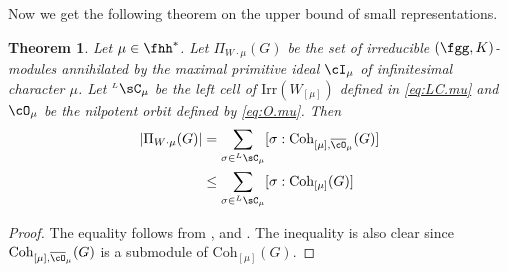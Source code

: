 \documentclass[12pt,a4paper]{amsart}
\def\abs#1{\left|{#1}\right|}
\DeclareMathOperator{\Ann}{Ann}
\numberwithin{equation}{section}
\newtheorem{thm}{Theorem}[section]
\newtheorem{cor}[thm]{Corollary}
\theoremstyle{remark}
\def\Irr{\mathrm{Irr}}
\def\LC{{}^{\scriptscriptstyle L}\sC}
\def\Coh{\mathrm{Coh}}
\begin{document}
\medskip

Now we get the following theorem on the upper bound of small representations.
\begin{thm}
  Let $\mu\in \fhh^{*}$. Let $\Pi_{W\cdot \mu}(G)$ be the set of irreducible
  $(\fgg,K)$-modules annihilated by the maximal primitive ideal $\cI_{\mu}$ of
  infinitesimal character $\mu$. Let $\LC_{\mu}$ be the left cell of
  $\Irr(W_{[\mu]})$ defined in \eqref{eq:LC.mu} and $\cO_{\mu}$ be the nilpotent
  orbit defined by \eqref{eq:O.mu}. Then
  \[
    \begin{split}
      \abs{\Pi_{W\cdot \mu}(G)} &= \sum_{\sigma\in \LC_{\mu}}
      [\sigma:\Coh_{[\mu],\bcO_{\mu}}(G)]\\
      &\leq \sum_{\sigma\in \LC_{\mu}}
      [\sigma:\Coh_{[\mu]}(G)]\\
    \end{split}
  \]
\end{thm}
\begin{proof}
  The equality follows from ,  and
  . The inequality is also clear since
  $\Coh_{[\mu],\bcO_{\mu}}(G)$ is a submodule of $\Coh_{[\mu]}(G)$.
\end{proof}




\end{document}
